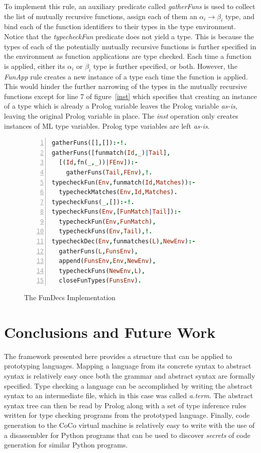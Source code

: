 \documentclass[10pt]{luthercs}
\begin{document}
To implement this rule, an auxiliary predicate called {\em gatherFuns} is used to collect the list of mutually recursive functions, assign each of them an $\alpha_i \rightarrow \beta_i$ type, and bind each of the function identifiers to their types in the type environment. Notice that the {\em typecheckFun} predicate does not yield a type. This is because the types of each of the potentially mutually recursive functions is further specified in the environment as function applications are type checked. Each time a function is applied, either its $\alpha_i$ or $\beta_i$ type is further specified, or both. However, the {\em FunApp} rule creates a new instance of a type each time the function is applied. This would hinder the further narrowing of the types in the mutually recursive functions except for line 7 of figure~\ref{inst} which specifies that creating an instance of a type which is already a Prolog variable leaves the Prolog variable {\em as-is}, leaving the original Prolog variable in place. The {\em inst} operation only creates instances of ML type variables. Prolog type variables are left {\em as-is}. 

\begin{figure}[htbp]
\begin{lstlisting}[language=Prolog,numbers=left,numberstyle=\tiny]
gatherFuns([],[]):-!.
gatherFuns([funmatch(Id,_)|Tail],
  [(Id,fn(_,_))|FEnv]):- 
    gatherFuns(Tail,FEnv),!.
typecheckFun(Env,funmatch(Id,Matches)):- 
  typecheckMatches(Env,Id,Matches).
typecheckFuns(_,[]):-!.
typecheckFuns(Env,[FunMatch|Tail]):- 
  typecheckFun(Env,FunMatch), 
  typecheckFuns(Env,Tail),!.
typecheckDec(Env,funmatches(L),NewEnv):- 
  gatherFuns(L,FunsEnv), 
  append(FunsEnv,Env,NewEnv), 
  typecheckFuns(NewEnv,L), 
  closeFunTypes(FunsEnv).
\end{lstlisting}
\caption{The FunDecs Implementation}
\label{fundecs}
\end{figure}

\section{Conclusions and Future Work}

The framework presented here provides a structure that can be applied to prototyping languages. Mapping a language from its concrete syntax to abstract syntax is relatively easy once both the grammar and abstract syntax are formally specified. Type checking a language can be accomplished by writing the abstract syntax to an intermediate file, which in this case was called {\em a.term}. The abstract syntax tree can then be read by Prolog along with a set of type inference rules written for type checking programs from the prototyped language. Finally, code generation to the CoCo virtual machine is relatively easy to write with the use of a disassembler for Python programs that can be used to discover {\em secrets} of code generation for similar Python programs. 
\end{document}
